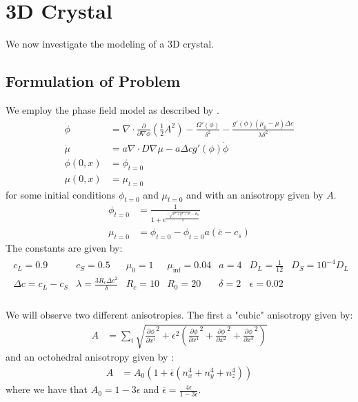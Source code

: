 \section{3D Crystal}
We now investigate the modeling of a 3D crystal.
\subsection{Formulation of Problem}
We employ the phase field model as described by \cite{Bollada2023}.
\begin{align*}
    \dot \phi &= \nabla \cdot \frac{\partial}{\partial \nabla \phi}(\frac12 A^2)-\frac{\Omega'(\phi)}{\delta^2} - \frac{g'(\phi)(\mu_0-\mu)\Delta c}{\lambda \delta^2}\\
    \dot \mu &= a\nabla \cdot D \nabla \mu - a \Delta c g'(\phi)\dot \phi\\
    \phi(0,x) &= \phi_{t=0}\\
    \mu(0,x) &= \mu_{t=0}
\end{align*}
for some initial conditions $\phi_{t=0}$ and $\mu_{t=0}$ and with an anisotropy given by $A$.
\begin{align*}
    \phi_{t=0} &= \frac{1}{1+e^{\frac{-\sqrt{x^2 + y^2 + z^2}-R_0}{\delta}}}\\
    \mu_{t=0} &= \phi_{t=0} - \phi_{t=0}a(\bar c - c_s)
\end{align*}
The constants are given by:
\begin{align*}
    \begin{matrix}
    c_L = 0.9 & c_S = 0.5 & \mu_0 = 1 & \mu_{\inf} = 0.04 & a = 4 & D_L= \frac{1}{12} & D_S = 10^{-4}D_L\\
    \Delta c = c_L - c_S & \lambda = \frac{3R_c\Delta c^2}{\delta} & R_c = 10 & R_0 = 20 & \delta = 2 & \epsilon = 0.02\\
    \end{matrix}
\end{align*}

We will observe two different anisotropies.
The first a "cubic" anisotropy given by:
\begin{align*}
    A &= \sum_i \sqrt{\frac{\partial \phi}{\partial x^i}^2 + \epsilon^2(\frac{\partial \phi}{\partial x^1}^2 + \frac{\partial \phi}{\partial x^2}^2 + \frac{\partial \phi}{\partial x^3}^2)}
\end{align*}
and an octohedral anisotropy given by \cite{Bollada2015}:
\begin{align*}
    A &= A_0 (1 + \bar \epsilon(n^4_x+n^4_y+n^4_z))
\end{align*}
where we have that $A_0 =1 -3\epsilon$ and $\bar \epsilon = \frac{4\epsilon}{1-3\epsilon}$.


